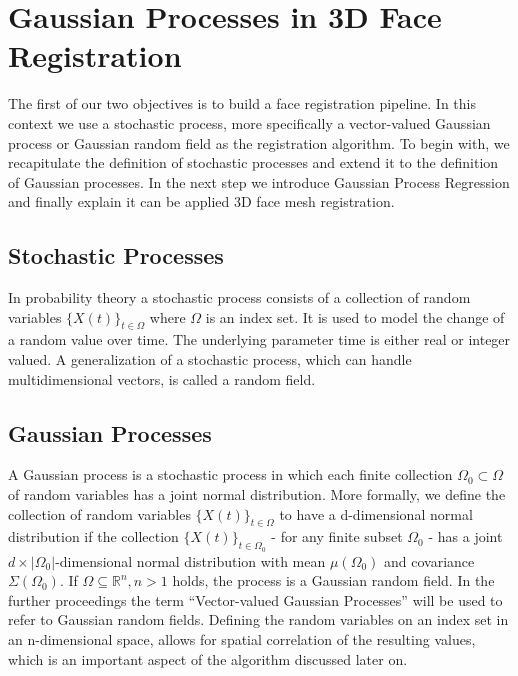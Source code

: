 \chapter{Gaussian Processes in 3D Face Registration}
The first of our two objectives is to build a face registration pipeline. 
In this context we use a stochastic process, more specifically a vector-valued Gaussian process or Gaussian random field as the registration algorithm.  
To begin with, we recapitulate the definition
of stochastic processes and extend it to the definition of Gaussian processes. In the next step we introduce Gaussian Process Regression and finally explain it can be applied 3D face mesh registration. 

\section{Stochastic Processes}

In probability theory a stochastic process consists of a collection of random variables $\{X(t)\}_{t \in \Omega}$ where $\Omega$ is an index set. It is used to model the change of a random value over time. The underlying parameter time is either real or integer valued. A generalization of a stochastic process, which can handle multidimensional vectors, is called a random field. 

\section{Gaussian Processes}

A Gaussian process is a stochastic process in which each finite collection $\Omega_{0} \subset \Omega$ of random variables has a joint normal distribution. More formally, we define the collection of random variables $\{X(t)\}_{t \in \Omega}$ to have a d-dimensional normal distribution if the collection $\{X(t)\}_{t \in \Omega_{0}}$ - for any finite subset $\Omega_{0}$ - has a joint $d\times \left| \Omega_{0} \right|$-dimensional normal distribution with mean
$\mu (\Omega_{0})$ and covariance $\Sigma (\Omega_{0})$.  
If $\Omega \subseteq \mathbb{R}^{n}, n>1$ holds, the process is a Gaussian random field. In the further proceedings the term ``Vector-valued Gaussian Processes'' will be used to refer to Gaussian random fields. Defining the random variables on an index set in an n-dimensional space, allows for spatial correlation of the resulting values, which is an important aspect of the algorithm discussed later on.

